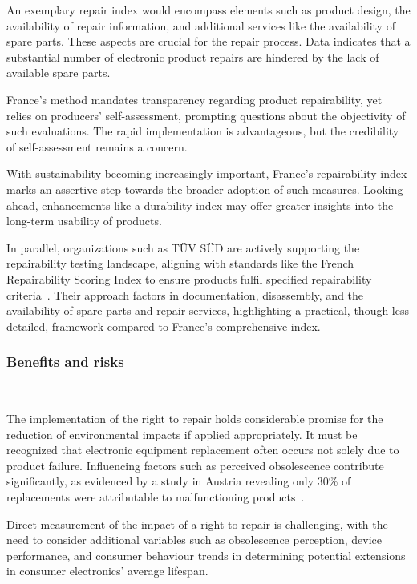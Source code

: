 An exemplary repair index would encompass elements such as product design, the
availability of repair information, and additional services like the
availability of spare parts. These aspects are crucial for the repair process.
Data indicates that a substantial number of electronic product repairs are
hindered by the lack of available spare parts.

France's method mandates transparency regarding product repairability, yet
relies on producers' self-assessment, prompting questions about the objectivity
of such evaluations. The rapid implementation is advantageous, but the
credibility of self-assessment remains a concern.

With sustainability becoming increasingly important, France's repairability
index marks an assertive step towards the broader adoption of such measures.
Looking ahead, enhancements like a durability index may offer greater insights
into the long-term usability of products.

In parallel, organizations such as TÜV SÜD are actively supporting the
repairability testing landscape, aligning with standards like the French
Repairability Scoring Index to ensure products fulfil specified repairability
criteria~\cite{tuv2023repair}. Their approach factors in documentation,
disassembly, and the availability of spare parts and repair services,
highlighting a practical, though less detailed, framework compared to France's
comprehensive index.

\subsubsection{Benefits and risks}

~\cite{eu2019repair, boulos2015durability, }

The implementation of the right to repair holds considerable promise for the
reduction of environmental impacts if applied appropriately. It must be
recognized that electronic equipment replacement often occurs not solely due to
product failure. Influencing factors such as perceived obsolescence contribute
significantly, as evidenced by a study in Austria revealing only 30\% of
replacements were attributable to malfunctioning products~\cite{wieser2018}.

Direct measurement of the impact of a right to repair is challenging, with the
need to consider additional variables such as obsolescence perception, device
performance, and consumer behaviour trends in determining potential extensions
in consumer electronics' average lifespan.

